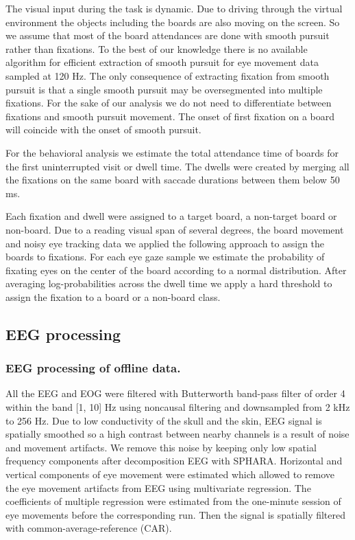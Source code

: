 \documentclass[12pt]{iopart}
\begin{document}
The visual input during the task is dynamic. Due to driving through
the virtual environment the objects including the boards are also moving on the screen.
So we assume that most of the board attendances are done with
smooth pursuit rather than fixations. 
To the best of our knowledge there is no available algorithm for efficient
extraction of smooth pursuit for eye movement data sampled at 120 Hz.
The only consequence of 
extracting fixation from smooth pursuit is that a single smooth pursuit
may be oversegmented into multiple fixations.
For the sake of our analysis we do not need to differentiate between
fixations and smooth pursuit movement. The onset of first fixation on a board
will coincide with the onset of smooth pursuit.

For the behavioral analysis we estimate the total attendance time of boards
for the first uninterrupted visit or dwell time. The dwells were created
by merging all the fixations on the same board with saccade durations
between them below 50 ms.

Each fixation and dwell were assigned to a target board, a non-target board or non-board.
Due to a reading visual span of several degrees, the board movement and 
noisy eye tracking data we applied the following approach to assign the boards
to fixations. For each eye gaze sample we estimate the probability of
fixating eyes on the center of the board according to a normal distribution.
After averaging log-probabilities across the dwell time we apply a hard
threshold to assign the fixation to a board or a non-board class.


\subsection{EEG processing}
\subsubsection*{EEG processing of offline data.}
All the EEG and EOG were filtered with Butterworth band-pass filter
of order 4 within the band [1, 10] Hz
using noncausal filtering and downsampled from 2 kHz to 256 Hz.
Due to low conductivity of the skull and the skin,
EEG signal is spatially smoothed so a high contrast between nearby channels
is a result of noise and movement artifacts. We remove this noise
by keeping only low spatial frequency components after decomposition EEG with SPHARA.
Horizontal and vertical components of eye movement were estimated which allowed
to remove the eye movement artifacts from EEG using multivariate regression.
The coefficients of multiple regression were estimated from the 
one-minute session of eye movements before the corresponding run.
Then the signal is spatially
filtered with common-average-reference (CAR). 
\end{document}
